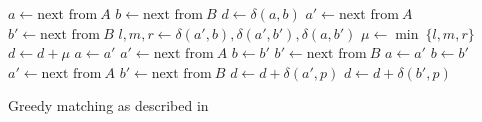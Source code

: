 \begin{algorithm}[ht]
  \begin{algorithmic}
    \State $a \gets \text{next from}~A$
    \State $b \gets \text{next from}~B$
    \State $d \gets \delta(a,b)$
    \State $a' \gets \text{next from}~A$
    \State $b' \gets \text{next from}~B$
      \State $l, m, r \gets \delta(a',b), \delta(a', b'), \delta(a, b')$
      \State $\mu \gets \min ~\{l, m, r\}$
      \State $d \gets d + \mu$
        \State $a \gets a'$
        \State $a' \gets \text{next from}~A$
        \State $b \gets b'$
        \State $b' \gets \text{next from}~B$
      \Else
        \State $a \gets a'$
        \State $b \gets b'$
        \State $a' \gets \text{next from}~A$
        \State $b' \gets \text{next from}~B$
      \EndIf
    \EndWhile
        \State $d \gets d + \delta(a',p)$
      \EndFor
        \State $d \gets d + \delta(b',p)$
      \EndFor
    \EndIf
  \end{algorithmic}
  \caption{Greedy matching as described in \cite{Kirsch}}
  \label{alg:greedy-matching}
\end{algorithm}

